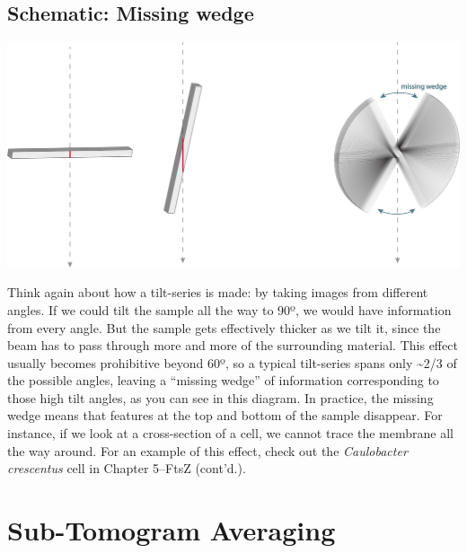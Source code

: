 \documentclass[]{tufte-book}
\begin{document}
\hypertarget{Missing_wedge}{\subsection*{Schematic: Missing
wedge}\label{Missing_wedge}}

\includegraphics{img/schematics/1_6_1}

Think again about how a tilt-series is made: by taking images from
different angles. If we could tilt the sample all the way to 90º, we
would have information from every angle. But the sample gets effectively
thicker as we tilt it, since the beam has to pass through more and more
of the surrounding material. This effect usually becomes prohibitive
beyond 60º, so a typical tilt-series spans only \textasciitilde{}2/3 of
the possible angles, leaving a ``missing wedge'' of information
corresponding to those high tilt angles, as you can see in this diagram.
In practice, the missing wedge means that features at the top and bottom
of the sample disappear. For instance, if we look at a cross-section of
a cell, we cannot trace the membrane all the way around. For an example
of this effect, check out the \emph{Caulobacter crescentus} cell in
Chapter 5--FtsZ (cont'd.).

\section{Sub-Tomogram Averaging}\label{sub-tomogram-averaging}
\end{document}
